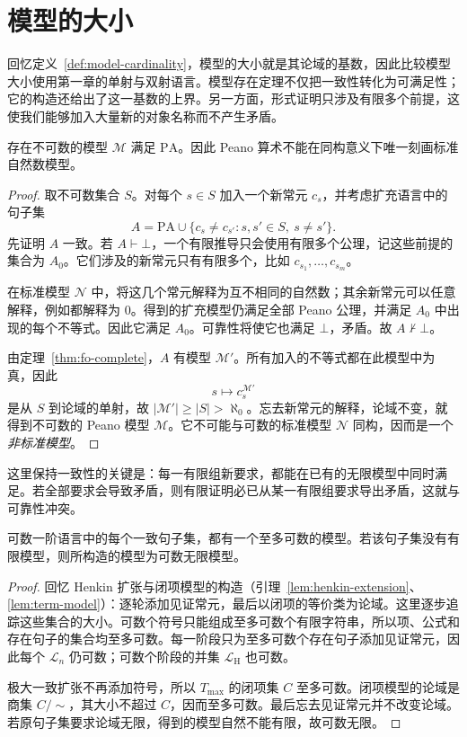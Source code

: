 \documentclass[lang=cn,a4paper,fontset=none,zihao=false,10pt,openany,twoside]{beautybook}
\numberwithin{algorithm}{chapter}
\begin{document}
\section{模型的大小}\label{sec:model-size}
回忆定义~\ref{def:model-cardinality}，模型的大小就是其论域的基数，因此比较模型大小使用第一章的单射与双射语言。模型存在定理不仅把一致性转化为可满足性；它的构造还给出了这一基数的上界。另一方面，形式证明只涉及有限多个前提，这使我们能够加入大量新的对象名称而不产生矛盾。

\begin{proposition}\label{prop:uncountable-pa}
存在不可数的模型 $\mathcal M$ 满足 $\mathrm{PA}$。因此 Peano 算术不能在同构意义下唯一刻画标准自然数模型。
\end{proposition}
\begin{proof}
取不可数集合 $S$。对每个 $s\in S$ 加入一个新常元 $c_s$，并考虑扩充语言中的句子集
\[
 A=\mathrm{PA}\cup\{c_s\ne c_{s'}:s,s'\in S,\ s\ne s'\}.
\]
先证明 $A$ 一致。若 $A\vdash\bot$，一个有限推导只会使用有限多个公理，记这些前提的集合为 $A_0$。它们涉及的新常元只有有限多个，比如 $c_{s_1},\ldots,c_{s_m}$。

在标准模型 $\mathcal N$ 中，将这几个常元解释为互不相同的自然数；其余新常元可以任意解释，例如都解释为 $0$。得到的扩充模型仍满足全部 Peano 公理，并满足 $A_0$ 中出现的每个不等式。因此它满足 $A_0$。可靠性将使它也满足 $\bot$，矛盾。故 $A\nvdash\bot$。

由定理~\ref{thm:fo-complete}，$A$ 有模型 $\mathcal M'$。所有加入的不等式都在此模型中为真，因此
\[
 s\longmapsto c_s^{\mathcal M'}
\]
是从 $S$ 到论域的单射，故 $|\mathcal M'|\ge|S|>\aleph_0$。忘去新常元的解释，论域不变，就得到不可数的 Peano 模型 $\mathcal M$。它不可能与可数的标准模型 $\mathcal N$ 同构，因而是一个\emph{非标准模型}。
\end{proof}

这里保持一致性的关键是：每一有限组新要求，都能在已有的无限模型中同时满足。若全部要求会导致矛盾，则有限证明必已从某一有限组要求导出矛盾，这就与可靠性冲突。

\begin{proposition}[可数语言中的小模型]\label{prop:countable-model}
可数一阶语言中的每个一致句子集，都有一个至多可数的模型。若该句子集没有有限模型，则所构造的模型为可数无限模型。
\end{proposition}
\begin{proof}
回忆 Henkin 扩张与闭项模型的构造（引理~\ref{lem:henkin-extension}、\ref{lem:term-model}）：逐轮添加见证常元，最后以闭项的等价类为论域。这里逐步追踪这些集合的大小。可数个符号只能组成至多可数个有限字符串，所以项、公式和存在句子的集合均至多可数。每一阶段只为至多可数个存在句子添加见证常元，因此每个 $\mathcal L_n$ 仍可数；可数个阶段的并集 $\mathcal L_{\mathrm H}$ 也可数。

极大一致扩张不再添加符号，所以 $T_{\max}$ 的闭项集 $C$ 至多可数。闭项模型的论域是商集 $C/{\sim}$，其大小不超过 $C$，因而至多可数。最后忘去见证常元并不改变论域。若原句子集要求论域无限，得到的模型自然不能有限，故可数无限。
\end{proof}
\end{document}
